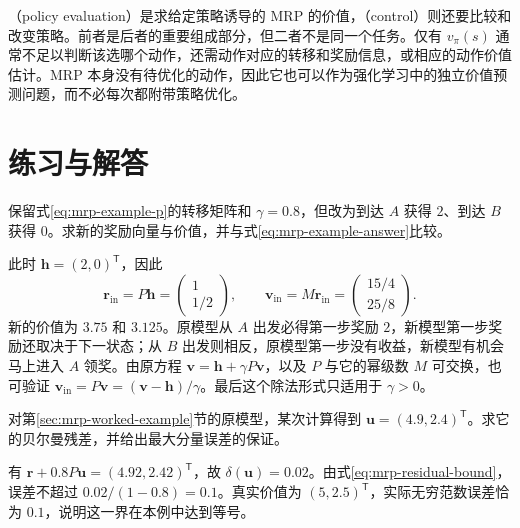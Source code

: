 \documentclass[UTF8]{ctexart}
\begin{document}
（policy evaluation）是求给定策略诱导的 MRP 的价值，（control）则还要比较和改变策略。前者是后者的重要组成部分，但二者不是同一个任务。仅有 $v_\pi(s)$ 通常不足以判断该选哪个动作，还需动作对应的转移和奖励信息，或相应的动作价值估计。MRP 本身没有待优化的动作，因此它也可以作为强化学习中的独立价值预测问题，而不必每次都附带策略优化。

\section{练习与解答}
\label{sec:mrp-exercises}

\begin{example}[同一组数字换一种奖励时序]
\label{ex:mrp-exercise-arrival}
保留式\eqref{eq:mrp-example-p}的转移矩阵和 $\gamma=0.8$，但改为到达 $A$ 获得 $2$、到达 $B$ 获得 $0$。求新的奖励向量与价值，并与式\eqref{eq:mrp-example-answer}比较。
\end{example}
\begin{solve}
此时 $\boldsymbol h=(2,0)^{\mathsf T}$，因此
\[
  \boldsymbol r_{\mathrm{in}}=P\boldsymbol h
    =\begin{pmatrix}1\\1/2\end{pmatrix},\qquad
  \boldsymbol v_{\mathrm{in}}=M\boldsymbol r_{\mathrm{in}}
    =\begin{pmatrix}15/4\\25/8\end{pmatrix}.
\]
新的价值为 $3.75$ 和 $3.125$。原模型从 $A$ 出发必得第一步奖励 $2$，新模型第一步奖励还取决于下一状态；从 $B$ 出发则相反，原模型第一步没有收益，新模型有机会马上进入 $A$ 领奖。由原方程 $\boldsymbol v=\boldsymbol h+\gamma P\boldsymbol v$，以及 $P$ 与它的幂级数 $M$ 可交换，也可验证 $\boldsymbol v_{\mathrm{in}}=P\boldsymbol v=(\boldsymbol v-\boldsymbol h)/\gamma$。最后这个除法形式只适用于 $\gamma>0$。
\end{solve}

\begin{example}[用残差判断计算是否足够准确]
对第\ref{sec:mrp-worked-example}节的原模型，某次计算得到 $\boldsymbol u=(4.9,2.4)^{\mathsf T}$。求它的贝尔曼残差，并给出最大分量误差的保证。
\end{example}
\begin{solve}
有 $\boldsymbol r+0.8P\boldsymbol u=(4.92,2.42)^{\mathsf T}$，故 $\delta(\boldsymbol u)=0.02$。由式\eqref{eq:mrp-residual-bound}，误差不超过 $0.02/(1-0.8)=0.1$。真实价值为 $(5,2.5)^{\mathsf T}$，实际无穷范数误差恰为 $0.1$，说明这一界在本例中达到等号。
\end{solve}
\end{document}
